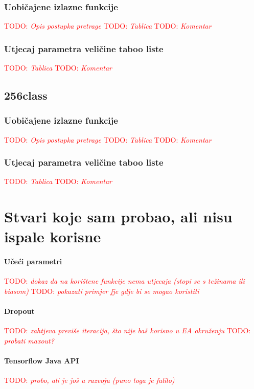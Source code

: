 \documentclass[times, utf8, diplomski]{fer}
\def\TODO#1{\noindent\textcolor{red}{TODO: \textit{#1}}\newline}
\def\todo#1{\TODO{#1}}
\begin{document}
\subsection{Uobičajene izlazne funkcije}
\todo{Opis postupka pretrage}
\todo{Tablica}
\todo{Komentar}

\subsection{Utjecaj parametra veličine taboo liste}
\todo{Tablica}
\todo{Komentar}

\section{256class}

\subsection{Uobičajene izlazne funkcije}
\todo{Opis postupka pretrage}
\todo{Tablica}
\todo{Komentar}

\subsection{Utjecaj parametra veličine taboo liste}
\todo{Tablica}
\todo{Komentar}

\chapter{Stvari koje sam probao, ali nisu ispale korisne}
\subsubsection{Učeći parametri}
\todo{dokaz da na korištene funkcije nema utjecaja (stopi se s težinama ili biasom)}
\todo{pokazati primjer fje gdje bi se mogao koristiti}

\subsubsection{Dropout}
\todo{zahtjeva previše iteracija, što nije baš korisno u EA okruženju}
\todo{probati maxout?}

\subsubsection{Tensorflow Java API}
\todo{probo, ali je još u razvoju (puno toga je falilo)}
\end{document}

